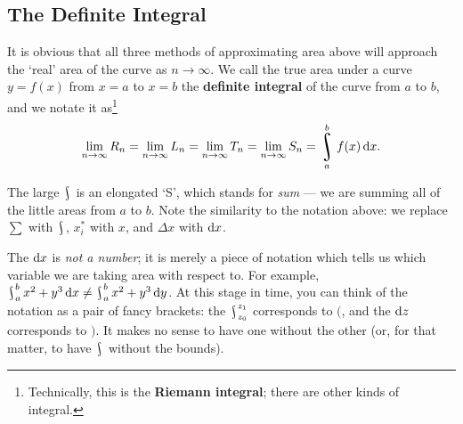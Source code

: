 \subsection*{The Definite Integral}
It is obvious that all three methods of approximating area above will approach the `real' area of the curve as $ n \to \infty $. We
call the true area under a curve $ y = f(x) $ from $ x = a $ to $ x = b $ the \textbf{definite integral} of the curve from $ a $ to $ b $,
and we notate it as\footnote{Technically, this is the \textbf{Riemann integral}; there are other kinds of integral.}
\begin{displaymath}
  \lim_{n \to \infty} R_n = \lim_{n \to \infty} L_n = \lim_{n \to \infty} T_n = \lim_{n \to \infty} S_n = \rint^b_a f(x) \dif{x}.
\end{displaymath}

The large $ \rint $ is an elongated `S', which stands for \textit{sum} --- we are summing all of the little areas from $ a $ to $ b $.
Note the similarity to the notation above: we replace $ \sum $ with $ \rint $, $ x_i^\ast $ with $ x $, and $ \Delta x $ with $ \dif{x} $.

The $ \dif{x} $ is \textit{not a number}; it is merely a piece of notation which tells us which variable we are taking area with respect to.
For example, $ \rint^b_a x^2 + y^3 \dif{x} \neq \rint^b_a x^2 + y^3 \dif{y} $. At this stage in time, you can think of the notation as a
pair of fancy brackets: the $ \rint^{z_1}_{z_0} $ corresponds to $ \big( $, and the $ \dif{z} $ corresponds to $ \big) $. It makes no
sense to have one without the other (or, for that matter, to have $ \rint $ without the bounds).

\clearpage
